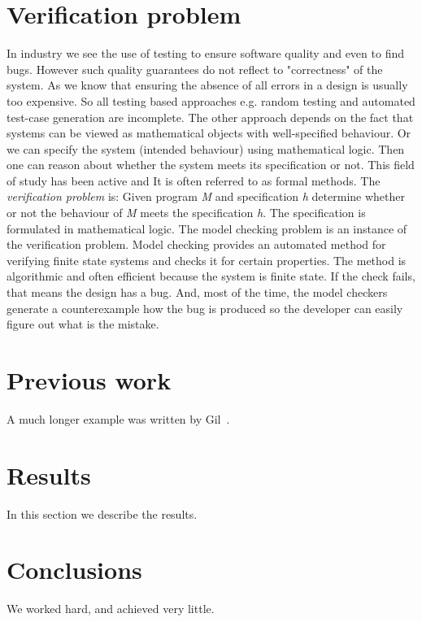 \documentclass[14pt]{article}
\begin{document}
\section{Verification problem}\label{verification problem}
In industry we see the use of testing to ensure software quality and even to find bugs. However such quality guarantees do not reflect to "correctness" of  the system. As we know that ensuring the absence of all errors in a design is usually too expensive. So all testing based approaches e.g. random testing and automated test-case generation are incomplete.  The other approach depends on the fact that systems can be viewed as mathematical objects with well-specified behaviour. Or we can specify the system (intended behaviour) using mathematical logic. Then one can reason about whether the system meets its specification or not. This field of study has been active and It is often referred to as formal methods. The \textit{verification problem} is: Given program \textit{M} and specification \textit{h} determine whether or not the behaviour of \textit{M} meets the specification \textit{h}. The specification is formulated in mathematical logic. The model checking problem is an instance of the verification problem. Model checking provides an automated method for verifying finite state systems and checks it for certain properties. The method is algorithmic and often efficient because the system is finite state. If the check fails, that means the design has a bug. And, most of the time, the model checkers generate a counterexample how the bug is produced so the developer can easily figure out what is the mistake.

\section{Previous work}\label{previous work}
A much longer \LaTeXe{} example was written by Gil~\cite{Gil:02}.


\section{Results}\label{results}
In this section we describe the results.

\section{Conclusions}\label{conclusions}
We worked hard, and achieved very little.



\end{document}

